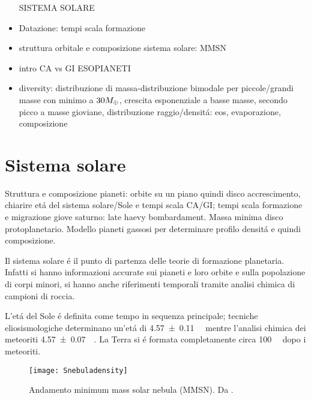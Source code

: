 \begin{workout}
\begin{itemize}
SISTEMA SOLARE
\item Datazione: tempi scala formazione
\item struttura orbitale e composizione sistema solare: MMSN
\item intro CA vs GI
ESOPIANETI
\item diversity: distribuzione di massa-distribuzione bimodale per piccole/grandi masse con minimo a $30M_{\oplus}$, crescita esponenziale a basse masse, secondo picco a masse gioviane, distribuzione raggio/densit\'a: eos, evaporazione, composizione


\end{itemize}
\end{workout}
{\let\clearpage\relax\let\cleardoublepage\relax
\chapter{Sistema solare}
}

\begin{workout}
Struttura e composizione pianeti: orbite su un piano quindi disco accrescimento, chiarire et\'a del sistema solare/Sole e tempi scala CA/GI; tempi scala formazione e migrazione giove saturno: late haevy bombardament. Massa minima disco protoplanetario. Modello pianeti gassosi per determinare profilo densit\'a e quindi composizione.
\end{workout}

Il sistema solare \'e il punto di partenza delle teorie di formazione planetaria. Infatti si hanno informazioni accurate sui pianeti e loro orbite e sulla popolazione di corpi minori, si hanno anche riferimenti temporali tramite analisi chimica di campioni di roccia.

L'et\'a del Sole \'e definita come tempo in sequenza principale; tecniche eliosismologiche determinano un'et\'a di \SI{4.57+-0.11}{\giga\year} mentre l'analisi chimica dei meteoriti \SI{4.57+-0.07}{\giga\year}.
La Terra si \'e formata completamente circa \SI{100}{\mega\year} dopo i meteoriti.

\begin{figure}[!ht]
\texttt{[image: Snebuladensity]}\caption{Andamento minimum mass solar nebula (MMSN). Da \cite{weidenschilling1977distribution}.}\label{fig:Snebuladensity}
\end{figure}


